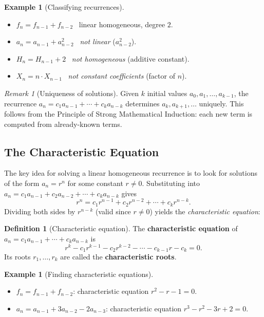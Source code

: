 \documentclass[11pt, a4paper, notitlepage]{report}
\theoremstyle{definition}
\newtheorem{definition}[theorem]{Definition}
\newtheorem{example}[theorem]{Example}
\theoremstyle{remark}
\newtheorem{remark}[theorem]{Remark}
\begin{document}
\begin{example}[Classifying recurrences]
\label{ex:classify}
\hfill
\begin{itemize}
  \item $f_n = f_{n-1} + f_{n-2}$ \quad \checkmark\ linear homogeneous, degree $2$.
  \item $a_n = a_{n-1} + a_{n-2}^2$ \quad \texttimes\ \emph{not linear} ($a_{n-2}^2$).
  \item $H_n = H_{n-1} + 2$ \quad \texttimes\ \emph{not homogeneous} (additive constant).
  \item $X_n = n \cdot X_{n-1}$ \quad \texttimes\ \emph{not constant coefficients} (factor of $n$).
\end{itemize}
\end{example}

\begin{remark}[Uniqueness of solutions]
Given $k$ initial values $a_0, a_1, \ldots, a_{k-1}$, the recurrence
$a_n = c_1 a_{n-1} + \cdots + c_k a_{n-k}$ determines $a_k, a_{k+1}, \ldots$ uniquely.
This follows from the Principle of Strong Mathematical Induction: each new term is computed
from already-known terms.
\end{remark}

\subsection{The Characteristic Equation}
\label{subsec:char-eq}

The key idea for solving a linear homogeneous recurrence is to look for solutions of the
form $a_n = r^n$ for some constant $r \neq 0$.  Substituting into
$a_n = c_1 a_{n-1} + c_2 a_{n-2} + \cdots + c_k a_{n-k}$ gives
\[
  r^n = c_1 r^{n-1} + c_2 r^{n-2} + \cdots + c_k r^{n-k}.
\]
Dividing both sides by $r^{n-k}$ (valid since $r \neq 0$) yields the
\emph{characteristic equation}:

\begin{definition}[Characteristic equation]
\label{def:char-eq}
The \textbf{characteristic equation} of $a_n = c_1 a_{n-1} + \cdots + c_k a_{n-k}$ is
\[
  r^k - c_1 r^{k-1} - c_2 r^{k-2} - \cdots - c_{k-1} r - c_k = 0.
\]
Its roots $r_1, \ldots, r_k$ are called the \textbf{characteristic roots}.
\end{definition}

\begin{example}[Finding characteristic equations]
\label{ex:char-eq}
\hfill
\begin{itemize}
  \item $f_n = f_{n-1} + f_{n-2}$: characteristic equation $r^2 - r - 1 = 0$.
  \item $a_n = a_{n-1} + 3a_{n-2} - 2a_{n-3}$: characteristic equation
        $r^3 - r^2 - 3r + 2 = 0$.
\end{itemize}
\end{example}
\end{document}
